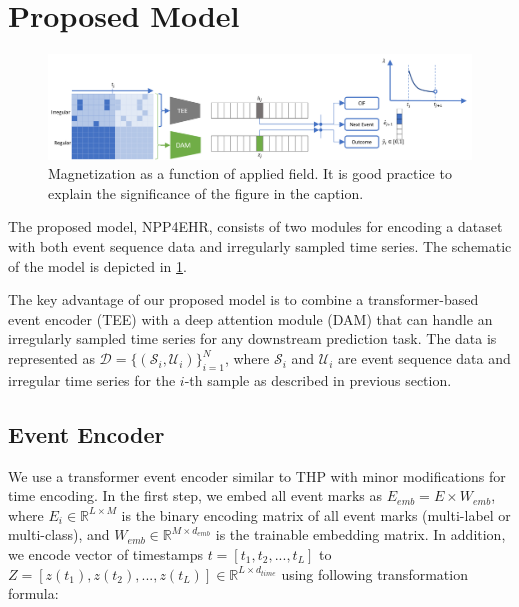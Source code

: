 \documentclass[journal,twoside,web]{ieeecolor}
\begin{document}
\section{Proposed Model}
\label{sec:Proposed Model}


\begin{figure}[!t]
\centerline{\includegraphics{images/model_arch.png}}
\caption{Magnetization as a function of applied field.
It is good practice to explain the significance of the figure in the caption.}
\label{fig1}
\end{figure}

The proposed model, NPP4EHR, consists of two modules for encoding a dataset with both event sequence data and irregularly sampled time series. The schematic of the model is depicted in \ref*{fig1}.

 The key advantage of our proposed model is to combine a transformer-based event encoder (TEE) with a deep attention module (DAM) that can handle an irregularly sampled time series for any downstream prediction task. The data is represented as $\mathcal{D}=\{(\mathcal{S}_i,\mathcal{U}_i)\}_{i=1}^{N}$, where $\mathcal{S}_i$ and $\mathcal{U}_i$ are event sequence data and irregular time series for the $i$-th sample as described in previous section.

\subsection{Event Encoder}
We use a transformer event encoder similar to THP \cite*{zuoTransformerHawkesProcess2020a} with minor modifications for time encoding.
In the first step, we embed all event marks as $E_{emb}=E \times W_{emb}$, where $E_i \in \mathbb{R}^{L \times M}$ is the binary encoding matrix of all event marks (multi-label or multi-class), and  $ W_{emb} \in  \mathbb{R}^{M \times d_{emb} }  $ is the trainable embedding matrix. In addition, we encode vector of timestamps $t=[t_1,t_2,...,t_L] $ to $Z=[z(t_1),z(t_2),...,z(t_L)]\in \mathbb{R}^{L \times d_{time}}$ using following transformation formula:
\end{document}
